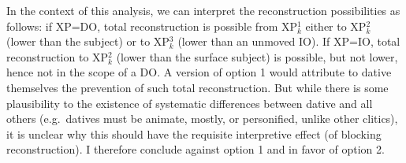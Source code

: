 \documentclass[output=paper]{langsci/langscibook}
\begin{document}
\ea\label{clitics}
\z
%
In the context of this analysis, we can interpret the reconstruction
possibilities as follows: if XP=DO, total reconstruction is possible from
XP$_k^1$ either to XP$_k^2$   (lower than the subject) or to XP$_k^3$ (lower
than an unmoved IO). If XP=IO, total reconstruction to  XP$_k^2$ (lower than
the surface subject) is possible, but not lower, hence not in the scope of a
DO.  A version of option 1 would attribute to dative  themselves the
prevention of such total reconstruction. But while there is some plausibility
to the existence of systematic differences between dative  and all
others (e.g.\ datives must be animate, mostly, or personified, unlike other
clitics), it is unclear why this should have the requisite interpretive effect
(of blocking reconstruction). I therefore conclude against option 1 and in
favor of option 2.
\end{document}
